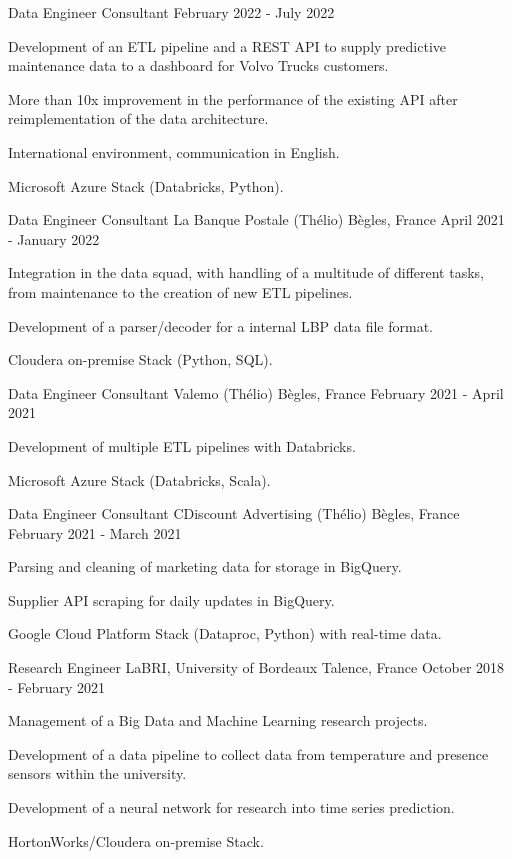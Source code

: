 \begin{cventries}
	\cventry
	{Data Engineer Consultant}{}{}
	{February 2022 - July 2022}
	{
		\begin{cvitems}
			\item {Development of an ETL pipeline and a REST API to supply predictive maintenance data to a dashboard for Volvo Trucks customers.}
			\item {More than 10x improvement in the performance of the existing API after reimplementation of the data architecture.}
			\item {International environment, communication in English.}
			\item {Microsoft Azure Stack (Databricks, Python).}
		\end{cvitems}
	}
	
	\cventry
	{Data Engineer Consultant}
	{La Banque Postale (Thélio)}
	{Bègles, France}
	{April 2021 - January 2022}
	{
		\begin{cvitems}
			\item {Integration in the data squad, with handling of a multitude of different tasks, from maintenance to the creation of new ETL pipelines.}
			\item {Development of a parser/decoder for a internal LBP data file format.}
			\item {Cloudera on-premise Stack (Python, SQL).}
		\end{cvitems}
	}
	
	\newpage

	\cventry
	{Data Engineer Consultant}
	{Valemo (Thélio)}
	{Bègles, France}
	{February 2021 - April 2021}
	{
		\begin{cvitems}
			\item {Development of multiple ETL pipelines with Databricks.}
			\item {Microsoft Azure Stack (Databricks, Scala).}
		\end{cvitems}
	}
	
	\cventry
	{Data Engineer Consultant}
	{CDiscount Advertising (Thélio)}
	{Bègles, France}
	{February 2021 - March 2021}
	{
		\begin{cvitems}
			\item {Parsing and cleaning of marketing data for storage in BigQuery.}
			\item {Supplier API scraping for daily updates in BigQuery.}
			\item {Google Cloud Platform Stack (Dataproc, Python) with real-time data.}
		\end{cvitems}
	}
	
	\cventry
	{Research Engineer}
	{LaBRI, University of Bordeaux}
	{Talence, France}
	{October 2018 - February 2021}
	{
		\begin{cvitems}
			\item {Management of a Big Data and Machine Learning research projects.}
			\item {Development of a data pipeline to collect data from temperature and presence sensors within the university.}
			\item {Development of a neural network for research into time series prediction.}
			\item {HortonWorks/Cloudera on-premise Stack.}
		\end{cvitems}
	}
	
\end{cventries}